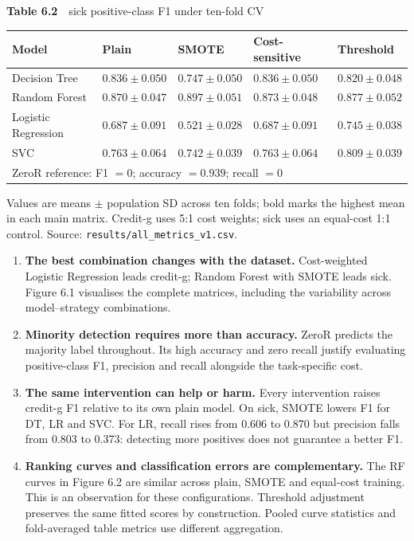 \documentclass[12pt]{article}
\begin{document}
\begin{center}
\begin{minipage}{\textwidth}
\centering
{\footnotesize\textbf{Table 6.2}\ \ sick positive-class F1 under ten-fold CV}

\footnotesize
\begin{tabular}{p{1.35in}p{0.95in}p{0.95in}p{0.95in}p{0.95in}}
\toprule
Model & Plain & SMOTE & Cost-sensitive & Threshold \\
\midrule
Decision Tree & $0.836 \pm 0.050$ & $0.747 \pm 0.050$ & $0.836 \pm 0.050$ & $0.820 \pm 0.048$ \\
Random Forest & $0.870 \pm 0.047$ & $\mathbf{0.897 \pm 0.051}$ & $0.873 \pm 0.048$ & $0.877 \pm 0.052$ \\
Logistic Regression & $0.687 \pm 0.091$ & $0.521 \pm 0.028$ & $0.687 \pm 0.091$ & $0.745 \pm 0.038$ \\
SVC & $0.763 \pm 0.064$ & $0.742 \pm 0.039$ & $0.763 \pm 0.064$ & $0.809 \pm 0.039$ \\
\midrule
\multicolumn{5}{l}{ZeroR reference: F1 $=0$; accuracy $=0.939$; recall $=0$} \\
\bottomrule
\end{tabular}
\end{minipage}
\end{center}

Values are means $\pm$ population SD across ten folds; bold marks the
highest mean in each main matrix. Credit-g uses 5:1 cost weights; sick uses an
equal-cost 1:1 control. Source: \texttt{results/all\_metrics\_v1.csv}.

\begin{enumerate}
\item \textbf{The best combination changes with the dataset.} Cost-weighted Logistic
Regression leads credit-g; Random Forest with SMOTE leads sick. Figure 6.1 visualises
the complete matrices, including the variability across model--strategy combinations.
\item \textbf{Minority detection requires more than accuracy.} ZeroR predicts the
majority label throughout. Its high accuracy and zero recall justify evaluating
positive-class F1, precision and recall alongside the task-specific cost.
\item \textbf{The same intervention can help or harm.} Every intervention raises
credit-g F1 relative to its own plain model. On sick, SMOTE lowers F1 for DT, LR and
SVC. For LR, recall rises from 0.606 to 0.870 but precision falls from 0.803 to 0.373:
detecting more positives does not guarantee a better F1.
\item \textbf{Ranking curves and classification errors are complementary.} The RF
curves in Figure 6.2 are similar across plain, SMOTE and equal-cost training. This is
an observation for these configurations. Threshold adjustment preserves the same
fitted scores by construction. Pooled curve statistics and fold-averaged table
metrics use different aggregation.
\end{enumerate}
\end{document}
